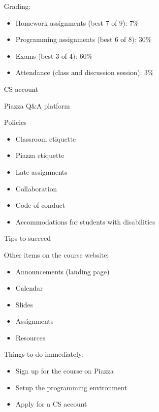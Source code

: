 \documentclass[8pt,a4paper,compress,handout]{beamer}
\begin{document}
\begin{frame}[fragile]
\pause
Grading:
\begin{itemize}
\item Homework assignments (best 7 of 9): 7\%
\item Programming assignments (best 6 of 8): 30\%
\item Exams (best 3 of 4): 60\%
\item Attendance (class and discussion session): 3\%
\end{itemize}

\pause
\bigskip

CS account

\pause
\bigskip

Piazza Q\&A platform

\pause
\bigskip

Policies
\begin{itemize}
\item Classroom etiquette
\item Piazza etiquette
\item Late assignments
\item Collaboration
\item Code of conduct
\item Accommodations for students with disabilities
\end{itemize}
\end{frame}

\begin{frame}[fragile]
\pause
Tips to succeed

\pause
\bigskip

Other items on the course website:
\begin{itemize}
\item Announcements (landing page)
\item Calendar
\item Slides 
\item Assignments
\item Resources
\end{itemize}

\pause
\bigskip

Things to do immediately:
\begin{itemize}
\item Sign up for the course on Piazza
\item Setup the programming environment
\item Apply for a CS account
\end{itemize}
\end{frame}
\end{document}
